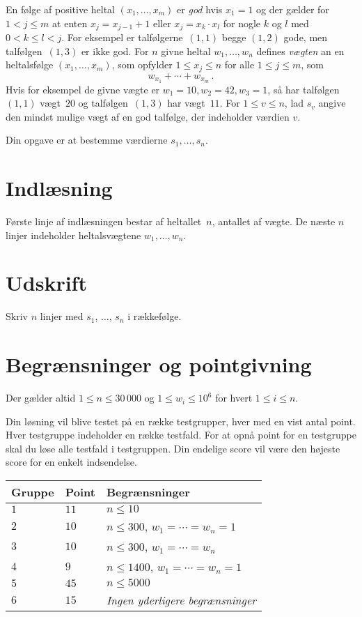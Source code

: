 
\noindent
En følge af positive heltal $(x_1,\ldots,x_m)$ er \emph{god} hvis  $x_1 = 1$ og der gælder for $1 < j \leq m$  at enten $x_j=x_{j-1}+1$ eller $x_j=x_k\cdot x_l$ for nogle $k$ og $l$ med $0< k\leq l< j$.
For eksempel er talfølgerne~$(1,1)$ begge $(1,2)$ gode, men talfølgen~$(1,3)$ er ikke god.
For  $n$ givne heltal $w_1,\ldots,w_n$ defines
\emph{vægten} an en heltalsfølge $(x_1,\ldots,x_m)$, som opfylder $1\leq x_j \leq n$ for alle $1\leq j\leq m$, som
\[ w_{x_1} +\cdots +w_{x_m}\,.\] 
Hvis for eksempel de givne vægte er $w_1=10,  w_2=42 ,w_3 = 1$, så har talfølgen~$(1,1)$ vægt~$20$ og talfølgen~$(1,3)$ har vægt~$11$.
For $1\leq v\leq n$, lad $s_v$ angive den mindst mulige vægt af en god talfølge, der indeholder værdien $v$.

Din opgave er at bestemme værdierne $s_1,\ldots ,s_n$.

\section*{Indlæsning}

Første linje af indlæsningen bestar af heltallet~$n$, antallet af vægte.
De næste $n$ linjer indeholder heltalsvægtene $w_1, \ldots, w_n$.

\section*{Udskrift}

Skriv $n$ linjer med $s_1$, $\ldots$, $s_n$ i rækkefølge.

\section*{Begrænsninger og pointgivning}

Der gælder altid
$1\leq n \leq 30\,000$ %
og
$1\leq w_i \leq 10^6$ for hvert $1\leq i \leq n$.%


Din løsning vil blive testet på en række testgrupper, hver med en vist antal point.
Hver testgruppe indeholder en række testfald.
For at opnå point for en testgruppe skal du løse alle testfald i testgruppen.
Din endelige score vil være den højeste score for en enkelt indsendelse.

\medskip
\begin{tabular}{lll}
Gruppe & Point & Begrænsninger \\\hline
$1$   & $11$ & $n\leq 10$ \\
$2$   & $10$ & $n\leq 300$, $w_1=\cdots=w_n = 1$ \\
$3$   & $10$ & $n\leq 300$, $w_1=\cdots=w_n$ \\ %
$4$   & $9$ & $n\leq 1400$, $w_1=\cdots=w_n = 1$ \\
$5$   & $45$ & $n\leq 5000$\\
$6$   & $15$ & \emph{Ingen yderligere begrænsninger}
\end{tabular}

